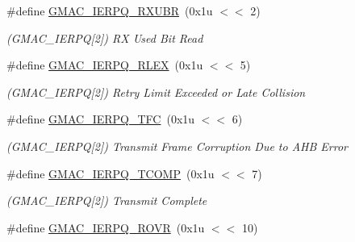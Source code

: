\begin{DoxyCompactItemize}
\mbox{\label{group__SAME70__GMAC_ga9e20bf6961344212900f8342727d09bd}} 
\#define \mbox{\hyperlink{group__SAME70__GMAC_ga9e20bf6961344212900f8342727d09bd}{G\+M\+A\+C\+\_\+\+I\+E\+R\+P\+Q\+\_\+\+R\+X\+U\+BR}}~(0x1u $<$$<$ 2)
\begin{DoxyCompactList}\small\item\em (G\+M\+A\+C\+\_\+\+I\+E\+R\+PQ\mbox{[}2\mbox{]}) RX Used Bit Read \end{DoxyCompactList}\item 
\mbox{\label{group__SAME70__GMAC_gae27d296675c812a8f4aaedbcdb930379}} 
\#define \mbox{\hyperlink{group__SAME70__GMAC_gae27d296675c812a8f4aaedbcdb930379}{G\+M\+A\+C\+\_\+\+I\+E\+R\+P\+Q\+\_\+\+R\+L\+EX}}~(0x1u $<$$<$ 5)
\begin{DoxyCompactList}\small\item\em (G\+M\+A\+C\+\_\+\+I\+E\+R\+PQ\mbox{[}2\mbox{]}) Retry Limit Exceeded or Late Collision \end{DoxyCompactList}\item 
\mbox{\label{group__SAME70__GMAC_gaa801a5e7a330ce350590bfd2aa6be841}} 
\#define \mbox{\hyperlink{group__SAME70__GMAC_gaa801a5e7a330ce350590bfd2aa6be841}{G\+M\+A\+C\+\_\+\+I\+E\+R\+P\+Q\+\_\+\+T\+FC}}~(0x1u $<$$<$ 6)
\begin{DoxyCompactList}\small\item\em (G\+M\+A\+C\+\_\+\+I\+E\+R\+PQ\mbox{[}2\mbox{]}) Transmit Frame Corruption Due to A\+HB Error \end{DoxyCompactList}\item 
\mbox{\label{group__SAME70__GMAC_gab30e8199f302d9db875471495d2dcb83}} 
\#define \mbox{\hyperlink{group__SAME70__GMAC_gab30e8199f302d9db875471495d2dcb83}{G\+M\+A\+C\+\_\+\+I\+E\+R\+P\+Q\+\_\+\+T\+C\+O\+MP}}~(0x1u $<$$<$ 7)
\begin{DoxyCompactList}\small\item\em (G\+M\+A\+C\+\_\+\+I\+E\+R\+PQ\mbox{[}2\mbox{]}) Transmit Complete \end{DoxyCompactList}\item 
\mbox{\label{group__SAME70__GMAC_gab72f59f7fe751e546e3c9727fedd2e38}} 
\#define \mbox{\hyperlink{group__SAME70__GMAC_gab72f59f7fe751e546e3c9727fedd2e38}{G\+M\+A\+C\+\_\+\+I\+E\+R\+P\+Q\+\_\+\+R\+O\+VR}}~(0x1u $<$$<$ 10)
$$
\end{DoxyCompactItemize}
